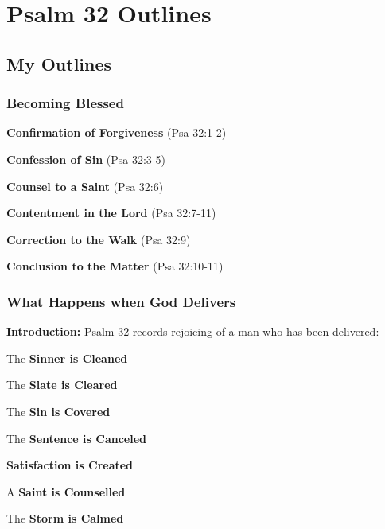 \section{Psalm 32 Outlines}

\subsection{My Outlines}

\subsubsection{Becoming Blessed}
\begin{compactenum}[I.]
    \item \textbf{Confirmation of Forgiveness}  (Psa 32:1-2)
    \item \textbf{Confession of Sin}  (Psa 32:3-5)
    \item \textbf{Counsel to a Saint}  (Psa 32:6)
    \item \textbf{Contentment in the Lord}  (Psa 32:7-11)
    \item \textbf{Correction to the Walk}  (Psa 32:9)
    \item \textbf{Conclusion to the Matter}  (Psa 32:10-11)
\end{compactenum}

\subsubsection{What Happens when God Delivers}
\textbf{Introduction: }Psalm 32 records rejoicing of a man who has been delivered:
\begin{compactenum}[I.]
    \item The \textbf{Sinner is Cleaned}
    \item The \textbf{Slate is Cleared}
    \item The \textbf{Sin is Covered}
    \item The \textbf{Sentence is Canceled}
    \item \textbf{Satisfaction is Created}
    \item A \textbf{Saint is Counselled}
    \item The \textbf{Storm is Calmed}
\end{compactenum}

